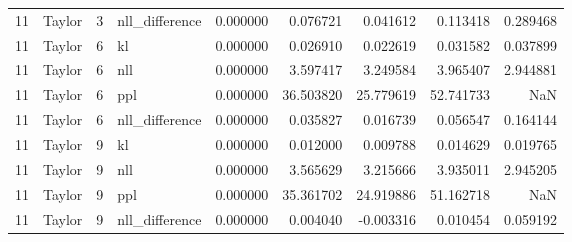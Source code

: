 \begin{tabular}{rlrlrrrrr}
11 & Taylor & 3 & nll_difference & 0.000000 & 0.076721 & 0.041612 & 0.113418 & 0.289468 \\
11 & Taylor & 6 & kl & 0.000000 & 0.026910 & 0.022619 & 0.031582 & 0.037899 \\
11 & Taylor & 6 & nll & 0.000000 & 3.597417 & 3.249584 & 3.965407 & 2.944881 \\
11 & Taylor & 6 & ppl & 0.000000 & 36.503820 & 25.779619 & 52.741733 & NaN \\
11 & Taylor & 6 & nll_difference & 0.000000 & 0.035827 & 0.016739 & 0.056547 & 0.164144 \\
11 & Taylor & 9 & kl & 0.000000 & 0.012000 & 0.009788 & 0.014629 & 0.019765 \\
11 & Taylor & 9 & nll & 0.000000 & 3.565629 & 3.215666 & 3.935011 & 2.945205 \\
11 & Taylor & 9 & ppl & 0.000000 & 35.361702 & 24.919886 & 51.162718 & NaN \\
11 & Taylor & 9 & nll_difference & 0.000000 & 0.004040 & -0.003316 & 0.010454 & 0.059192 \\
\bottomrule
\end{tabular}
